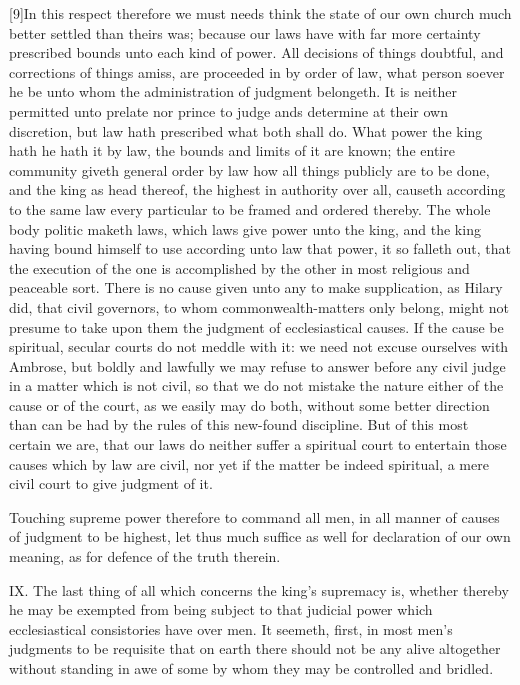 [9]In this respect therefore we must needs think the state of our own church much better settled than theirs was; because our laws have with far more certainty prescribed bounds unto each kind of power. All decisions of things doubtful, and corrections of things amiss, are proceeded in by order of law, what person soever he be unto whom the administration of judgment belongeth. It is neither permitted unto prelate nor prince to judge ands determine at their own discretion, but law hath prescribed what both shall do. What power the king hath he hath it by law, the bounds and limits of it are known; the entire community giveth general order by law how all things publicly are to be done, and the king as head thereof, the highest in authority over all, causeth according to the same law every particular to be framed and ordered thereby. The whole body politic maketh laws, which laws give power unto the king, and the king having bound himself to use according unto law that power, it so falleth out, that the execution of the one is accomplished by the other in most religious and peaceable sort. There is no cause given unto any to make supplication, as Hilary did, that civil governors, to whom commonwealth-matters only belong, might not presume to take upon them the judgment of ecclesiastical causes. If the cause be spiritual, secular courts do not meddle with it: we need not excuse ourselves with Ambrose, but boldly and lawfully we may refuse to answer before any civil  judge in a matter which is not civil, so that we do not mistake the nature either of the cause or of the court, as we easily may do both, without some better direction than can be had by the rules of this new-found discipline. But of this most certain we are, that our laws do neither suffer a spiritual court to entertain those causes which by law are civil, nor yet if the matter be indeed spiritual, a mere civil court to give judgment of it.

Touching supreme power therefore to command all men, in all manner of causes of judgment to be highest, let thus much suffice as well for declaration of our own meaning, as for defence of the truth therein.

IX. The last thing of all which concerns the king’s supremacy is, whether thereby he may be exempted from being subject to that judicial power which ecclesiastical consistories have over men. It seemeth, first, in most men’s judgments to be requisite that on earth there should not be any alive altogether without standing in awe of some by whom they may be controlled and bridled.

